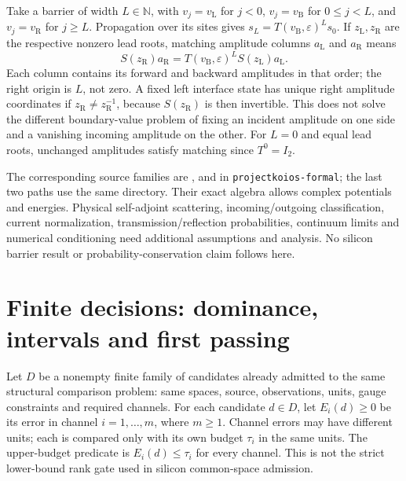 Take a barrier of width $L\in\mathbb N$, with $v_j=v_{\mathrm L}$ for
$j<0$, $v_j=v_{\mathrm B}$ for $0\leq j<L$, and $v_j=v_{\mathrm R}$ for
$j\geq L$. Propagation over its sites gives $s_L=T(v_{\mathrm B},\varepsilon)^L s_0$.
If $z_{\mathrm L},z_{\mathrm R}$ are the respective nonzero lead roots,
matching amplitude columns $a_{\mathrm L}$ and $a_{\mathrm R}$ means
\begin{equation}
  S(z_{\mathrm R})a_{\mathrm R}
    =T(v_{\mathrm B},\varepsilon)^L S(z_{\mathrm L})a_{\mathrm L}.
  \label{eq:auxiliary-barrier-amplitude-matching}
\end{equation}
Each column contains its forward and backward amplitudes in that order;
the right origin is $L$, not zero. A fixed left interface state has unique
right amplitude coordinates if $z_{\mathrm R}\ne z_{\mathrm R}^{-1}$,
because $S(z_{\mathrm R})$ is then invertible. This does not solve the
different boundary-value problem of fixing an incident amplitude on one side
and a vanishing incoming amplitude on the other. For $L=0$ and equal lead
roots, unchanged amplitudes satisfy matching since $T^0=I_2$.

The corresponding source families are
,
 and  in
\texttt{projectkoios-formal}; the last two paths use the same directory.
Their exact algebra allows complex potentials and energies. Physical
self-adjoint scattering, incoming/outgoing classification, current
normalization, transmission/reflection probabilities, continuum limits and
numerical conditioning need additional assumptions and analysis. No silicon
barrier result or probability-conservation claim follows here.

\section{Finite decisions: dominance, intervals and first passing}

Let $D$ be a nonempty finite family of candidates already admitted to the
same structural comparison problem: same spaces, source, observations,
units, gauge constraints and required channels. For each candidate $d\in D$,
let $E_i(d)\geq0$ be its error in channel $i=1,\ldots,m$, where $m\geq1$.
Channel errors may have different units; each is compared only with its own
budget $\tau_i$ in the same units. The upper-budget predicate is
$E_i(d)\leq\tau_i$ for every channel. This is not the strict lower-bound
rank gate used in silicon common-space admission.

